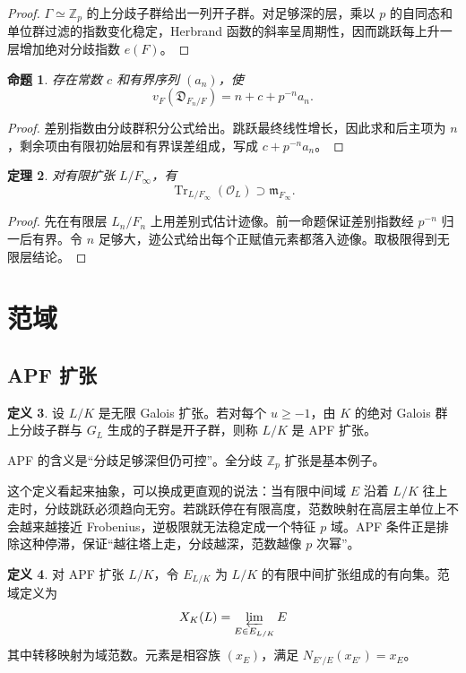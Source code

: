 \documentclass[11pt,a4paper,openany]{ctexbook}
\numberwithin{equation}{chapter}
\newcommand{\Z}{\mathbb{Z}}
\theoremstyle{plain}
\newtheorem{theorem}{定理}[chapter]
\newtheorem{proposition}[theorem]{命题}
\theoremstyle{definition}
\newtheorem{definition}[theorem]{定义}
\theoremstyle{remark}
\begin{document}
\begin{proof}
$\Gamma\simeq\Z_p$ 的上分歧子群给出一列开子群。对足够深的层，乘以 $p$ 的自同态和单位群过滤的指数变化稳定，Herbrand 函数的斜率呈周期性，因而跳跃每上升一层增加绝对分歧指数 $e(F)$。
\end{proof}

\begin{proposition}
存在常数 $c$ 和有界序列 $(a_n)$，使
\[
  v_F(\mathfrak D_{F_n/F})=n+c+p^{-n}a_n.
\]
\end{proposition}

\begin{proof}
差别指数由分歧群积分公式给出。跳跃最终线性增长，因此求和后主项为 $n$，剩余项由有限初始层和有界误差组成，写成 $c+p^{-n}a_n$。
\end{proof}

\begin{theorem}
对有限扩张 $L/F_\infty$，有
\[
  \operatorname{Tr}_{L/F_\infty}(\mathcal O_L)\supset \mathfrak m_{F_\infty}.
\]
\end{theorem}

\begin{proof}
先在有限层 $L_n/F_n$ 上用差别式估计迹像。前一命题保证差别指数经 $p^{-n}$ 归一后有界。令 $n$ 足够大，迹公式给出每个正赋值元素都落入迹像。取极限得到无限层结论。
\end{proof}

\section{范域}

\subsection{APF 扩张}

\begin{definition}
设 $L/K$ 是无限 Galois 扩张。若对每个 $u\ge-1$，由 $K$ 的绝对 Galois 群上分歧子群与 $G_L$ 生成的子群是开子群，则称 $L/K$ 是 APF 扩张。
\end{definition}

APF 的含义是“分歧足够深但仍可控”。全分歧 $\Z_p$ 扩张是基本例子。

这个定义看起来抽象，可以换成更直观的说法：当有限中间域 $E$ 沿着 $L/K$ 往上走时，分歧跳跃必须趋向无穷。若跳跃停在有限高度，范数映射在高层主单位上不会越来越接近 Frobenius，逆极限就无法稳定成一个特征 $p$ 域。APF 条件正是排除这种停滞，保证“越往塔上走，分歧越深，范数越像 $p$ 次幂”。

\begin{definition}
对 APF 扩张 $L/K$，令 $E_{L/K}$ 为 $L/K$ 的有限中间扩张组成的有向集。范域定义为
\[
  X_K(L)=\varprojlim_{E\in E_{L/K}} E
\]
其中转移映射为域范数。元素是相容族 $(x_E)$，满足 $N_{E'/E}(x_{E'})=x_E$。
\end{definition}
\end{document}
